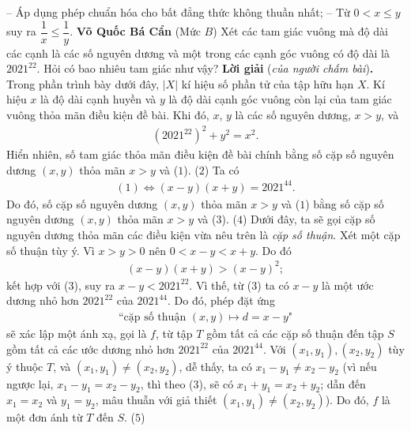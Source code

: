 \begin{multicols}{2}
	\vskip 0.05cm
	-- Áp dụng phép chuẩn hóa cho bất đẳng thức không thuần nhất;
	\vskip 0.05cm
	-- Từ $0 < x \le y$ suy ra  $\dfrac{1}{x} \le \dfrac{1}{y}$.
	\vskip 0.05cm 
	\hfill \textbf{Võ Quốc Bá Cẩn}
	\vskip 0.05cm
	{}
	(Mức $B$) Xét các tam giác vuông mà độ dài các cạnh là các số nguyên dương và một trong các cạnh góc vuông có độ dài là $2021^{22}$. Hỏi có bao nhiêu tam giác như vậy? 
	\vskip 0.05cm
	\textbf{Lời giải} (\textit{của người chấm bài})\textbf{.}
	\vskip 0.05cm
	Trong phần trình bày dưới đây, $|X|$ kí hiệu số phần tử của tập hữu hạn $X$.
	\vskip 0.05cm
	Kí hiệu $x$ là độ dài cạnh huyền và $y$ là độ dài cạnh góc vuông còn lại của tam giác vuông thỏa mãn điều kiện đề bài. Khi đó, $x$, $y$ là các số nguyên dương, $x > y$, và
	\begin{align*}
		{\left( {{{2021}^{22}}} \right)^2} + {y^2} = {x^2}. \tag{$1$}
	\end{align*}
	Hiển nhiên, số tam giác thỏa mãn điều kiện đề bài chính bằng số cặp số nguyên dương $(x, y)$ thỏa mãn $x > y$ và ($1$). \hfill ($2$)
	\vskip 0.05cm
	Ta có
	\begin{align*}
		(1) \Leftrightarrow \left( {x - y} \right)\left( {x + y} \right) = {2021^{44}}. \tag{$3$}
	\end{align*}
	Do đó, số cặp số nguyên dương $(x, y)$ thỏa mãn $x > y$ và ($1$) bằng số cặp số nguyên dương $(x, y)$ thỏa mãn $x > y$ và ($3$). \hfill ($4$)
	\vskip 0.05cm
	Dưới đây, ta sẽ gọi cặp số nguyên dương thỏa mãn các điều kiện vừa nêu trên là \textit{cặp số thuận}.
	\vskip 0.05cm
	Xét một cặp số thuận tùy ý. Vì $x > y > 0$ nên  $0 < x - y < x + y$. Do đó
	\begin{align*}
		\left( {x - y} \right)\left( {x + y} \right) > {\left( {x - y} \right)^2};
	\end{align*}
	kết hợp với ($3$), suy ra $x - y < 2021^{22}$. Vì thế, từ ($3$) ta có $x - y$ là một ước dương nhỏ hơn $2021^{22}$  của $2021^{44}$. Do đó, phép đặt ứng
	\begin{align*}
		\text{``cặp số thuận } (x, y) \mapsto   d = x - y\text{"}
	\end{align*}
	sẽ xác lập một ánh xạ, gọi là $f$, từ tập $T$ gồm tất cả các cặp số thuận đến tập $S$ gồm tất cả các ước dương nhỏ hơn $2021^{22}$  của $2021^{44}$.
	\vskip 0.05cm 
	Với $\left( {{x_1},{y_1}} \right),\left( {{x_2},{y_2}} \right)$  tùy ý thuộc $T$, và $\left( {{x_1},{y_1}} \right) \ne \left( {{x_2},{y_2}} \right)$, dễ thấy, ta có ${x_1} - {y_1} \ne {x_2} - {y_2}$  (vì nếu ngược lại,  ${x_1} - {y_1} = {x_2} - {y_2}$, thì theo ($3$), sẽ có  ${x_1} + {y_1} = {x_2} + {y_2}$; dẫn đến $x_1 = x_2$  và  $y_1 = y_2$, mâu thuẫn với giả thiết  $\left( {{x_1},{y_1}} \right) \ne \left( {{x_2},{y_2}} \right)$). Do đó,  $f$ là một đơn ánh từ $T$ đến $S$. \hfill  ($5$)

\end{multicols}
